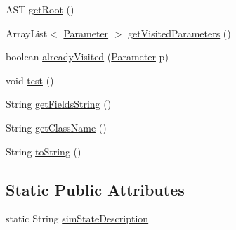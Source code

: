 \begin{DoxyCompactItemize}
A\-S\-T \hyperlink{classit_1_1isislab_1_1masonassisteddocumentation_1_1mason_1_1analizer_1_1_sim_state_analizer_ad271c4ee4ffe808dcaa5fecc39cb7bd4}{get\-Root} ()
\item 
Array\-List$<$ \hyperlink{classit_1_1isislab_1_1masonassisteddocumentation_1_1mason_1_1analizer_1_1_parameter}{Parameter} $>$ \hyperlink{classit_1_1isislab_1_1masonassisteddocumentation_1_1mason_1_1analizer_1_1_sim_state_analizer_a9fb2508f0bb14958d8aa2e409ae41f8d}{get\-Visited\-Parameters} ()
\item 
boolean \hyperlink{classit_1_1isislab_1_1masonassisteddocumentation_1_1mason_1_1analizer_1_1_sim_state_analizer_a0a0e3dd3cbc27027c93a4f935382ac55}{already\-Visited} (\hyperlink{classit_1_1isislab_1_1masonassisteddocumentation_1_1mason_1_1analizer_1_1_parameter}{Parameter} p)
\item 
void \hyperlink{classit_1_1isislab_1_1masonassisteddocumentation_1_1mason_1_1analizer_1_1_sim_state_analizer_a6c5d3f04cc9c6fa5e01c1e50166c09ea}{test} ()
\item 
String \hyperlink{classit_1_1isislab_1_1masonassisteddocumentation_1_1mason_1_1analizer_1_1_sim_state_analizer_a592724e3534a0e18a3ef68bbf502fd33}{get\-Fields\-String} ()
\item 
String \hyperlink{classit_1_1isislab_1_1masonassisteddocumentation_1_1mason_1_1analizer_1_1_sim_state_analizer_a9d891a1b9c5b9fc2e83bca09df312f2b}{get\-Class\-Name} ()
\item 
String \hyperlink{classit_1_1isislab_1_1masonassisteddocumentation_1_1mason_1_1analizer_1_1_sim_state_analizer_a14f8302dff6fb0e3a6230c7e53468f41}{to\-String} ()
\end{DoxyCompactItemize}
\subsection*{Static Public Attributes}
\begin{DoxyCompactItemize}
\item 
static String \hyperlink{classit_1_1isislab_1_1masonassisteddocumentation_1_1mason_1_1analizer_1_1_sim_state_analizer_ab98fca6fef047e90490ba9f87cc5fcc0}{sim\-State\-Description}
\end{DoxyCompactItemize}
